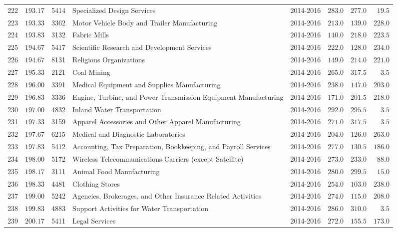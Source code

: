 \documentclass[9pt, oneside]{article}   	%
\begin{document}
\begin{longtable}{cccp{2.0in}cccc}
222  & $193.17$ & 5414 & Specialized Design Services & 2014-2016 & $283.0$ & $277.0$ & $\phantom{0}19.5$ \\
223  & $193.33$ & 3362 & Motor Vehicle Body and Trailer Manufacturing & 2014-2016 & $213.0$ & $139.0$ & $228.0$ \\
224  & $193.83$ & 3132 & Fabric Mills & 2014-2016 & $140.0$ & $218.0$ & $223.5$ \\
225  & $194.67$ & 5417 & Scientific Research and Development Services & 2014-2016 & $222.0$ & $128.0$ & $234.0$ \\
226  & $194.67$ & 8131 & Religious Organizations & 2014-2016 & $149.0$ & $214.0$ & $221.0$ \\
227  & $195.33$ & 2121 & Coal Mining & 2014-2016 & $265.0$ & $317.5$ & $\phantom{00}3.5$ \\
228  & $196.00$ & 3391 & Medical Equipment and Supplies Manufacturing & 2014-2016 & $238.0$ & $147.0$ & $203.0$ \\
229  & $196.83$ & 3336 & Engine, Turbine, and Power Transmission Equipment Manufacturing & 2014-2016 & $171.0$ & $201.5$ & $218.0$ \\
230  & $197.00$ & 4832 & Inland Water Transportation & 2014-2016 & $292.0$ & $295.5$ & $\phantom{00}3.5$ \\
231  & $197.33$ & 3159 & Apparel Accessories and Other Apparel Manufacturing & 2014-2016 & $271.0$ & $317.5$ & $\phantom{00}3.5$ \\
232  & $197.67$ & 6215 & Medical and Diagnostic Laboratories & 2014-2016 & $204.0$ & $126.0$ & $263.0$ \\
233  & $197.83$ & 5412 & Accounting, Tax Preparation, Bookkeeping, and Payroll Services & 2014-2016 & $277.0$ & $130.5$ & $186.0$ \\
234  & $198.00$ & 5172 & Wireless Telecommunications Carriers (except Satellite) & 2014-2016 & $273.0$ & $233.0$ & $\phantom{0}88.0$ \\
235  & $198.17$ & 3111 & Animal Food Manufacturing & 2014-2016 & $280.0$ & $299.5$ & $\phantom{0}15.0$ \\
236  & $198.33$ & 4481 & Clothing Stores & 2014-2016 & $254.0$ & $103.0$ & $238.0$ \\
237  & $199.00$ & 5242 & Agencies, Brokerages, and Other Insurance Related Activities & 2014-2016 & $274.0$ & $115.0$ & $208.0$ \\
238  & $199.83$ & 4883 & Support Activities for Water Transportation & 2014-2016 & $286.0$ & $310.0$ & $\phantom{00}3.5$ \\
239  & $200.17$ & 5411 & Legal Services & 2014-2016 & $272.0$ & $155.5$ & $173.0$ \\

\end{longtable}
\end{document}
